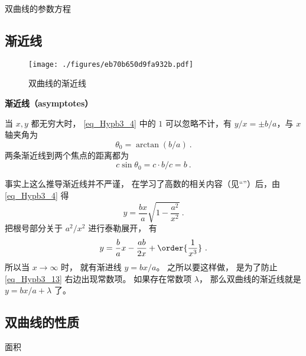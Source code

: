 \begin{theorem}{双曲线的参数方程}

\end{theorem}

\subsection{渐近线}
\begin{figure}[ht]
\centering
\texttt{[image: ./figures/eb70b650d9fa932b.pdf]}
\caption{双曲线的渐近线} \label{fig_Hypb3_1}
\end{figure}
\textbf{渐近线（asymptotes）}

当 $x,y$ 都无穷大时， \autoref{eq_Hypb3_4} 中的 $1$ 可以忽略不计，有 $y/x = \pm b/a$，与 $x$ 轴夹角为
\begin{equation}\label{eq_Hypb3_1}
\theta_0 = \arctan(b/a)~.
\end{equation}
两条渐近线到两个焦点的距离都为
\begin{equation}\label{eq_Hypb3_11}
c\sin\theta_0 = c\cdot b/c = b~.
\end{equation}


事实上这么推导渐近线并不严谨， 在学习了高数的相关内容（见“”）后，由\autoref{eq_Hypb3_4} 得
\begin{equation}
y = \frac{bx}{a} \sqrt{1-\frac{a^2}{x^2}}~.
\end{equation}
把根号部分关于 $a^2/x^2$ 进行泰勒展开， 有
\begin{equation}\label{eq_Hypb3_13}
y = \frac ba x - \frac{ab}{2x} + \order{\frac{1}{x^3}}~.
\end{equation}
所以当 $x\to\infty$ 时， 就有渐进线 $y = bx/a$。 之所以要这样做， 是为了防止\autoref{eq_Hypb3_13} 右边出现常数项。 如果存在常数项 $\lambda$， 那么双曲线的渐近线就是 $y = bx/a + \lambda$ 了。

\subsection{双曲线的性质}
面积









